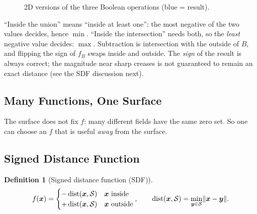 \documentclass[11pt,a4paper]{article}
\newcommand{\Surf}{\mathcal{S}}
\newcommand{\vx}{\bm{x}}
\newcommand{\vy}{\bm{y}}
\DeclareMathOperator{\dist}{dist}
\theoremstyle{definition}
\newtheorem{definition}{Definition}[section]
\theoremstyle{plain}
\theoremstyle{remark}
\begin{document}
\begin{figure}[ht]
\centering
{}
\caption{2D versions of the three Boolean operations (blue = result).}
\end{figure}

\begin{intuition}
``Inside the union'' means ``inside at least one'': the most negative of the two values decides, hence $\min$. ``Inside the intersection'' needs both, so the \emph{least} negative value decides: $\max$. Subtraction is intersection with the outside of $B$, and flipping the sign of $f_B$ swaps inside and outside. The \emph{sign} of the result is always correct; the magnitude near sharp creases is not guaranteed to remain an exact distance (see the SDF discussion next).
\end{intuition}

\subsection{Many Functions, One Surface }
The surface does not fix $f$: many different fields have the same zero set. So one can choose an $f$ that is useful \emph{away} from the surface.

\subsection{Signed Distance Function }
\begin{definition}[Signed distance function (SDF)]
\[
f(\vx)=\begin{cases}-\dist(\vx,\Surf)&\vx\text{ inside}\\ +\dist(\vx,\Surf)&\vx\text{ outside}\end{cases},\qquad \dist(\vx,\Surf)=\min_{\vy\in\Surf}\norm{\vx-\vy}.
\]
\end{definition}
\end{document}
